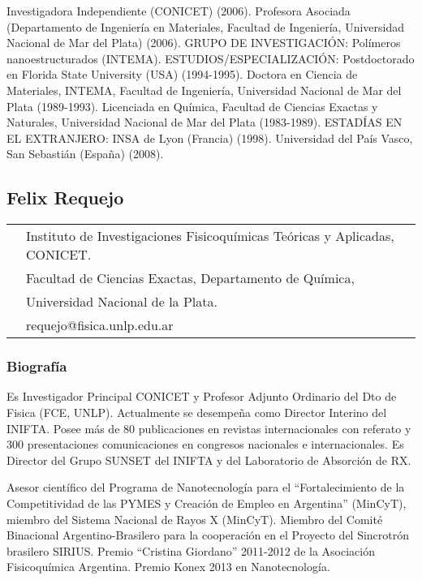 Investigadora Independiente (CONICET) (2006). Profesora Asociada (Departamento
de Ingenier\'ia en Materiales, Facultad de Ingenier\'ia, Universidad Nacional de
Mar del Plata) (2006). GRUPO DE INVESTIGACI\'ON: Pol\'imeros nanoestructurados
(INTEMA). ESTUDIOS/ESPECIALIZACI\'ON: Postdoctorado en Florida State University
(USA) (1994-1995). Doctora en Ciencia de Materiales, INTEMA,  Facultad de
Ingenier\'ia, Universidad Nacional de Mar del Plata (1989-1993). Licenciada en
Qu\'imica, Facultad de Ciencias Exactas y Naturales, Universidad Nacional de Mar
del Plata (1983-1989). ESTADÍAS EN EL EXTRANJERO: INSA de Lyon (Francia) (1998).
Universidad del Pa\'is Vasco, San Sebasti\'an (España) (2008).

\subsection*{Felix Requejo}

\begin{tabular}{ l l}
{\multirow{3}{*}{\texttt{[image: requejo]}}} & Instituto
de Investigaciones Fisicoqu\'imicas Te\'oricas y Aplicadas, CONICET. \\
 & Facultad de Ciencias Exactas, Departamento de Qu\'imica,   \\
 & Universidad Nacional de la Plata. \\
 & requejo@fisica.unlp.edu.ar
\end{tabular}

\subsubsection*{Biograf\'ia}

Es Investigador Principal CONICET y Profesor Adjunto Ordinario del Dto de Fisica
(FCE, UNLP). Actualmente se desempeña como Director Interino del INIFTA. Posee
m\'as de 80 publicaciones en revistas internacionales con referato y 300
presentaciones comunicaciones en congresos nacionales e internacionales. Es
Director del Grupo SUNSET del INIFTA y del Laboratorio de Absorci\'on de RX.

Asesor cient\'ifico del Programa de Nanotecnolog\'ia para el ``Fortalecimiento
de la Competitividad de las PYMES y Creaci\'on de Empleo en Argentina''
(MinCyT), miembro del Sistema Nacional de Rayos X (MinCyT). Miembro del Comit\'e
Binacional Argentino-Brasilero para la cooperaci\'on en el Proyecto del
Sincrotr\'on brasilero SIRIUS.
Premio ``Cristina Giordano'' 2011-2012 de la Asociaci\'on Fisicoqu\'imica
Argentina.
Premio Konex 2013 en Nanotecnolog\'ia.


